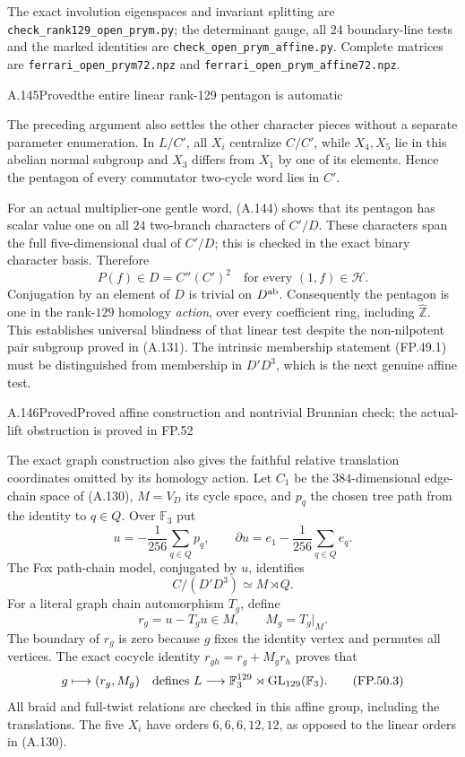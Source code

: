 The exact involution eigenspaces and invariant splitting are
\texttt{check\_rank129\_open\_prym.py}; the determinant gauge,
all $24$ boundary-line tests and the marked identities are
\texttt{check\_open\_prym\_affine.py}. Complete matrices are
\texttt{ferrari\_open\_prym72.npz} and
\texttt{ferrari\_open\_prym\_affine72.npz}.

\begin{statement}{A.145}{Proved}{the entire linear rank-129 pentagon is automatic}
\end{statement}
The preceding argument also settles the other character
pieces without a separate parameter enumeration. In $L/C'$,
all $X_i$ centralize $C/C'$, while $X_4,X_5$ lie in this
abelian normal subgroup and $X_3$ differs from $X_1$ by
one of its elements. Hence the pentagon of every commutator
two-cycle word lies in $C'$.

For an actual multiplier-one gentle word, (A.144) shows
that its pentagon has scalar value one on all $24$ two-branch
characters of $C'/D$. These characters span the full
five-dimensional dual of $C'/D$; this is checked in the exact
binary character basis. Therefore
\[
        \boxed{\quad P(f)\in D=C''(C')^2
                   \quad\text{for every }(1,f)\in\mathcal H.\quad}
 \tag{FP.49.1}
\]
Conjugation by an element of $D$ is trivial on $D^{\rm ab}$.
Consequently the pentagon is one in the rank-$129$ homology
\emph{action}, over every coefficient ring, including
$\widehat{\mathbb Z}$. This establishes universal blindness
of that linear test despite the non-nilpotent pair subgroup
proved in (A.131). The intrinsic membership statement
(FP.49.1) must be distinguished from membership in
$D'D^3$, which is the next genuine affine test.

\begin{statement}{A.146}{Proved}{Proved affine construction and nontrivial Brunnian check; the actual-lift obstruction is proved in FP.52}
\end{statement}
The exact graph construction also gives the faithful
relative translation coordinates omitted by its homology
action. Let $C_1$ be the $384$-dimensional edge-chain space
of (A.130), $M=V_D$ its cycle space, and $p_q$ the chosen
tree path from the identity to $q\in Q$. Over $\mathbb F_3$ put
\[
 u=-\frac1{256}\sum_{q\in Q}p_q,
 \qquad \partial u=e_1-\frac1{256}\sum_{q\in Q}e_q.
 \tag{FP.50.1}
\]
The Fox path-chain model, conjugated by $u$, identifies
\[
          C/(D'D^3)\simeq M\rtimes Q.
\]
For a literal graph chain automorphism $T_g$, define
\[
                 r_g=u-T_gu\in M,
                 \qquad M_g=T_g|_M.
 \tag{FP.50.2}
\]
The boundary of $r_g$ is zero because $g$ fixes the identity
vertex and permutes all vertices. The exact cocycle identity
$r_{gh}=r_g+M_gr_h$ proves that
\[
             g\longmapsto(r_g,M_g)
       \quad\hbox{defines } L\longrightarrow
             \mathbb F_3^{129}\rtimes\operatorname{GL}_{129}(\mathbb F_3).
 \tag{FP.50.3}
\]
All braid and full-twist relations are checked in this
affine group, including the translations. The five $X_i$
have orders $6,6,6,12,12$, as opposed to the linear orders
in (A.130).

